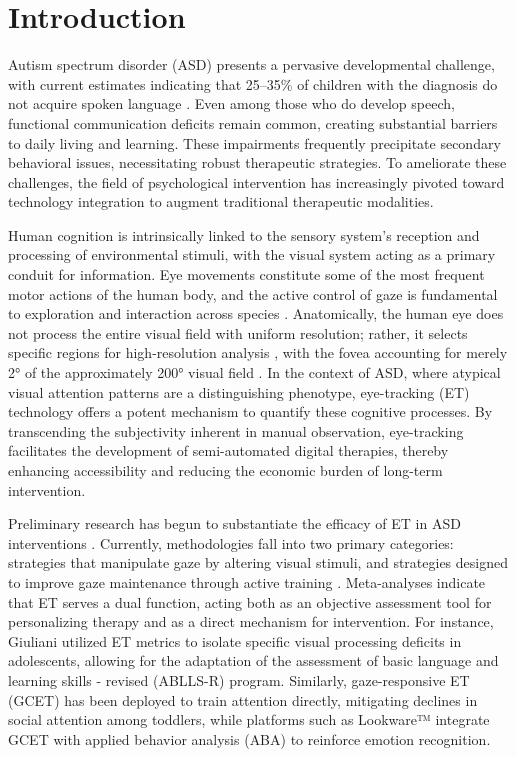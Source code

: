 \section{Introduction}
Autism spectrum disorder (ASD) presents a pervasive developmental challenge, with current estimates indicating that 25–35\% of children with the diagnosis do not acquire spoken language \cite{refASDlang}. Even among those who do develop speech, functional communication deficits remain common, creating substantial barriers to daily living and learning. These impairments frequently precipitate secondary behavioral issues, necessitating robust therapeutic strategies. To ameliorate these challenges, the field of psychological intervention has increasingly pivoted toward technology integration to augment traditional therapeutic modalities.

Human cognition is intrinsically linked to the sensory system's reception and processing of environmental stimuli, with the visual system acting as a primary conduit for information. Eye movements constitute some of the most frequent motor actions of the human body, and the active control of gaze is fundamental to exploration and interaction across species \cite{ref04}. Anatomically, the human eye does not process the entire visual field with uniform resolution; rather, it selects specific regions for high-resolution analysis \cite{ref05}, with the fovea accounting for merely 2° of the approximately 200° visual field \cite{ref06}. In the context of ASD, where atypical visual attention patterns are a distinguishing phenotype, eye-tracking (ET) technology offers a potent mechanism to quantify these cognitive processes. By transcending the subjectivity inherent in manual observation, eye-tracking facilitates the development of semi-automated digital therapies, thereby enhancing accessibility and reducing the economic burden of long-term intervention.

Preliminary research has begun to substantiate the efficacy of ET in ASD interventions \cite{Nguyen2025,Nguyen2024}. Currently, methodologies fall into two primary categories: strategies that manipulate gaze by altering visual stimuli, and strategies designed to improve gaze maintenance through active training \cite{Nguyen2025}. Meta-analyses indicate that ET serves a dual function, acting both as an objective assessment tool for personalizing therapy and as a direct mechanism for intervention. For instance, Giuliani \cite{ref09} utilized ET metrics to isolate specific visual processing deficits in adolescents, allowing for the adaptation of the assessment of basic language and learning skills - revised (ABLLS-R) program. Similarly, gaze-responsive ET (GCET) \cite{ref10} has been deployed to train attention directly, mitigating declines in social attention among toddlers, while platforms such as Lookware™ \cite{ref11} integrate GCET with applied behavior analysis (ABA) to reinforce emotion recognition.

